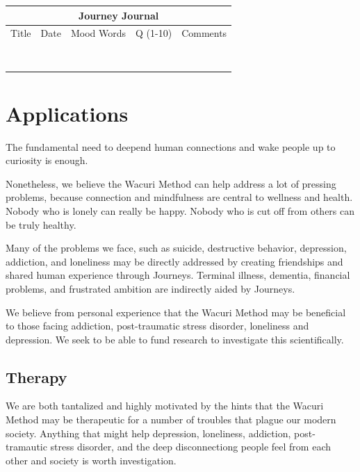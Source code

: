 \documentclass[12pt]{book}
\begin{document}
\begin{tabular}{ |p{2cm}||p{2cm}|p{3cm}|p{1cm}|p{5cm}|  }
 \hline
 \multicolumn{5}{|c|}{Journey Journal} \\
 \hline
 Title& Date & Mood Words & Q (1-10) & Comments\\
  \hline
 \hline
 & & & & \\
 \hline 
 & & & & \\
 \hline 
 & & & & \\
 \hline 
 & & & & \\
 \hline 
 & & & & \\
 \hline 
 & & & & \\
 \hline 
 & & & & \\
 \hline 
  & & & & \\
 \hline
  \hline
\end{tabular}

\chapter{Applications}

The fundamental need to deepend human connections and wake people up to curiosity is enough.

Nonetheless, we believe the Wacuri Method can help address a lot of pressing problems, because
connection and mindfulness are central to wellness and health. Nobody who is lonely can really
be happy. Nobody who is cut off from others can be truly healthy.

Many of the problems we face, such as suicide, destructive behavior, depression, addiction, and loneliness may be directly
addressed by creating friendships and shared human experience through Journeys. Terminal illness,
dementia, financial problems, and frustrated ambition are indirectly aided by Journeys.

We believe from personal experience that the Wacuri Method may be beneficial to those facing addiction,
post-traumatic stress disorder, loneliness and depression.  We seek to be able to fund research
to investigate this scientifically.

\section{Therapy}

We are both tantalized and highly motivated by the hints that the Wacuri Method may be therapeutic
for a number of troubles that plague our modern society. Anything that might help depression,
loneliness, addiction, post-tramautic stress disorder, and the deep disconnectiong people
feel from each other and society is worth investigation.
\end{document}
